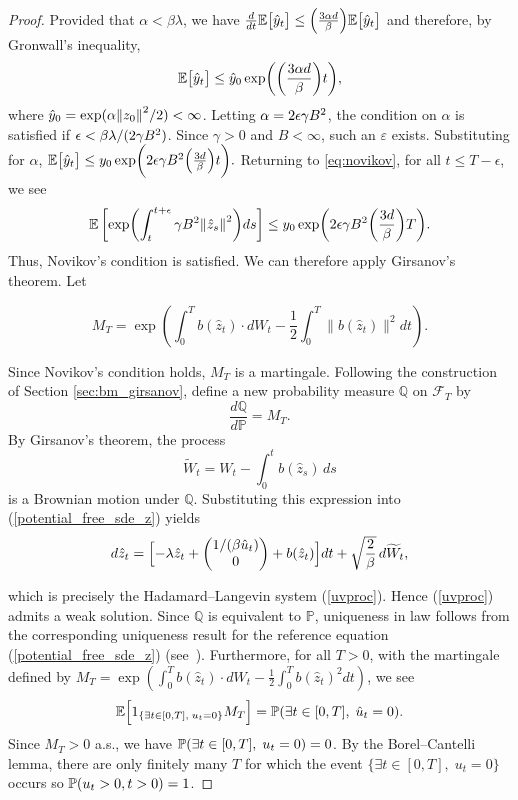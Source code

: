 \documentclass[11pt, twoside]{report}
\begin{document}
\begin{proof}
Provided that $ \alpha<\beta \lambda $, we have $\frac{d}{dt}\EE\bigl[\hat y_t\bigr] \leq  \pa{\frac{3\alpha d}{\beta}} \EE\bigl[\hat y_t\bigr]$ and therefore, by Gronwall's inequality,
$$
\EE\bigl[\hat{y}_t\bigr]  \leq \hat y_0 \exp\biggl(  \pa{\frac{3 \alpha d}{\beta}} t\biggr),
$$
where $\hat{y}_0=\exp(\alpha \norm{z_0}^2/2)<\infty$. 
Letting $\alpha = 2\epsilon \gamma B^2 $, the condition on $\alpha$ is satisfied if $\epsilon  <\beta\lambda/(2\gamma B^2)$. Since $\gamma>0$ and $B<\infty$, such an $\varepsilon$ exists. Substituting for $\alpha$,
$
\EE\bigl[\hat{y}_t\bigr]  \leq y_0 \exp\biggl(2\epsilon \gamma \cinfty^2  \pa{\frac{3 d}{\beta}} t\biggr).
$
Returning to \eqref{eq:novikov}, for all $t\leq T-\epsilon$, we see
$$
\EE\left[ \exp\pa{\int_t^{t+\epsilon} \gamma \cinfty^2 \norm{\hat{z}_s}^2} ds \right] \leq y_0\exp\biggl( 2\epsilon \gamma \cinfty^2  \pa{\frac{3 d}{\beta}} T\biggr).
$$
Thus, Novikov's condition is satisfied. We can therefore apply Girsanov's theorem. Let

\[
M_T
=
\exp\!\left(
\int_0^T b(\hat z_t)\cdot dW_t
-
\frac12
\int_0^T \|b(\hat z_t)\|^2dt
\right).
\]

Since Novikov's condition holds, \(M_T\) is a martingale.
Following the construction of Section \ref{sec:bm_girsanov}, define a new probability measure \(\mathbb Q\) on
\(\mathcal F_T\) by
\[
\frac{d\mathbb Q}{d\mathbb P}=M_T .
\]
By Girsanov's theorem, the process
\[
\widetilde W_t
=
W_t-\int_0^t b(\hat z_s)\,ds
\]
is a Brownian motion under \(\mathbb Q\).
Substituting this expression into (\ref{potential_free_sde_z}) yields
\[
d\hat z_t
=
\Bigl[-\lambda \hat z_t
+\begin{pmatrix}
1/(\beta \hat u_t)\\
0
\end{pmatrix}
+b(\hat z_t)\Bigr]dt
+
\sqrt{\frac{2}{\beta}}\,d\widetilde W_t,
\]

which is precisely the Hadamard--Langevin system (\ref{uvproc}). Hence (\ref{uvproc}) admits a weak solution. Since \(\mathbb Q\) is equivalent to \(\mathbb P\), uniqueness in
law follows from the corresponding uniqueness result for the
reference equation (\ref{potential_free_sde_z}) (see~\cite[Corollary 5.14]{Karatzas1991-xr}).
Furthermore, for all $T>0$, with the martingale defined by $M_T = \exp(\int_0^T b(\hat z_t) \cdot dW_t - \frac12 \int_0^T b(\hat z_t)^2 dt)$, we see
$$
\mathbb{E}\Bigl[1_{\{\exists t\in [0,T], \; u_t=0\}} M_T\Bigr] =\mathbb{P}(\exists t\in [0,T], \;\hat u_t =0).
$$
Since $M_T>0$ a.s., we have $\mathbb{P}(\exists t\in [0,T], \; u_t=0) = 0$.
By the Borel--Cantelli lemma, there are only finitely many $T$ for which the event $\{\exists t\in [0,T],\; u_t=0\}$ occurs so $\mathbb{P}(u_t>0, t>0) = 1$. 
\end{proof}
\end{document}
